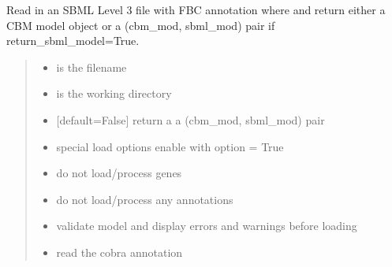 \documentclass[letterpaper,12pt,english]{sphinxmanual}
\begin{document}
\begin{fulllineitems}
\label{\detokenize{api/io:cbmpy.CBXML.sbml_readSBML3FBC}}
\pysigstartsignatures
\pysiglinewithargsret
{}
{\sphinxparamcomma {}\sphinxparamcomma {}\sphinxparamcomma {}}
{}
\pysigstopsignatures
\sphinxAtStartPar
Read in an SBML Level 3 file with FBC annotation where and return either a CBM model object or a (cbm\_mod, sbml\_mod) pair if return\_sbml\_model=True.
\begin{quote}\begin{description}
\begin{itemize}
\item {} 
\sphinxAtStartPar
{} \textendash{} is the filename

\item {} 
\sphinxAtStartPar
{} \textendash{} is the working directory

\item {} 
\sphinxAtStartPar
{} \textendash{} {[}default=False{]} return a a (cbm\_mod, sbml\_mod) pair

\item {} 
\sphinxAtStartPar
{} \textendash{} special load options enable with option = True

\item {} 
\sphinxAtStartPar
{} \textendash{} do not load/process genes

\item {} 
\sphinxAtStartPar
{} \textendash{} do not load/process any annotations

\item {} 
\sphinxAtStartPar
{} \textendash{} validate model and display errors and warnings before loading

\item {} 
\sphinxAtStartPar
{} \textendash{} read the cobra annotation


\end{itemize}
\end{description}
\end{quote}
\end{fulllineitems}
\end{document}
